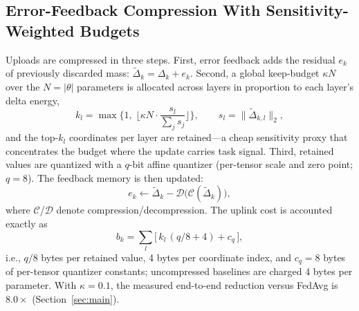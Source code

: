 \documentclass[journal]{IEEEtran}
\begin{document}
\subsection{Error-Feedback Compression With Sensitivity-Weighted Budgets}\label{sec:compress}
Uploads are compressed in three steps. First, error feedback \cite{karimireddy2019} adds the residual $e_k$ of previously discarded mass: $\tilde{\Delta}_k = \Delta_k + e_k$. Second, a global keep-budget $\kappa N$ over the $N = |\theta|$ parameters is allocated across layers in proportion to each layer's delta energy,
\begin{equation}\label{eq:alloc}
k_l = \max\!\Big\{1,\; \Big\lfloor \kappa N \cdot \frac{s_l}{\sum_j s_j} \Big\rfloor\Big\}, \qquad s_l = \lVert \tilde{\Delta}_{k,l} \rVert_2,
\end{equation}
and the top-$k_l$ coordinates per layer are retained---a cheap sensitivity proxy that concentrates the budget where the update carries task signal. Third, retained values are quantized with a $q$-bit affine quantizer (per-tensor scale and zero point; $q = 8$). The feedback memory is then updated:
\begin{equation}\label{eq:ef}
e_k \leftarrow \tilde{\Delta}_k - \mathcal{D}\big(\mathcal{C}(\tilde{\Delta}_k)\big),
\end{equation}
where $\mathcal{C}$/$\mathcal{D}$ denote compression/decompression. The uplink cost is accounted exactly as
\begin{equation}\label{eq:bytes}
b_k = \sum_{l} \big[\, k_l \,(q/8 + 4) + c_q \,\big],
\end{equation}
i.e., $q/8$ bytes per retained value, 4 bytes per coordinate index, and $c_q = 8$ bytes of per-tensor quantizer constants; uncompressed baselines are charged 4 bytes per parameter. With $\kappa = 0.1$, the measured end-to-end reduction versus FedAvg is $8.0\times$ (Section~\ref{sec:main}).
\end{document}
